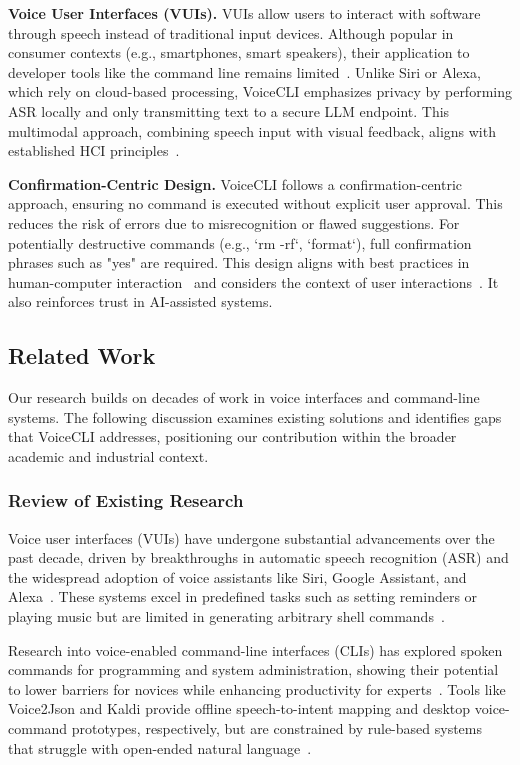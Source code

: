 \documentclass[a4paper,12pt]{article}
\begin{document}
\textbf{Voice User Interfaces (VUIs).} VUIs allow users to interact with software through speech instead of traditional input devices. Although popular in consumer contexts (e.g., smartphones, smart speakers), their application to developer tools like the command line remains limited~\cite{ref7}. Unlike Siri or Alexa, which rely on cloud-based processing, VoiceCLI emphasizes privacy by performing ASR locally and only transmitting text to a secure LLM endpoint. This multimodal approach, combining speech input with visual feedback, aligns with established HCI principles~\cite{ref6}.

\textbf{Confirmation-Centric Design.} VoiceCLI follows a confirmation-centric approach, ensuring no command is executed without explicit user approval. This reduces the risk of errors due to misrecognition or flawed suggestions. For potentially destructive commands (e.g., `rm -rf`, `format`), full confirmation phrases such as "yes" are required. This design aligns with best practices in human-computer interaction~\cite{ref12} and considers the context of user interactions~\cite{ref13}. It also reinforces trust in AI-assisted systems.


\subsection{Related Work}

\noindent Our research builds on decades of work in voice interfaces and command-line systems. The following discussion examines existing solutions and identifies gaps that VoiceCLI addresses, positioning our contribution within the broader academic and industrial context.

\subsubsection{Review of Existing Research}
Voice user interfaces (VUIs) have undergone substantial advancements over the past decade, driven by breakthroughs in automatic speech recognition (ASR) and the widespread adoption of voice assistants like Siri, Google Assistant, and Alexa~\cite{ref7}. These systems excel in predefined tasks such as setting reminders or playing music but are limited in generating arbitrary shell commands~\cite{ref4}. 

Research into voice-enabled command-line interfaces (CLIs) has explored spoken commands for programming and system administration, showing their potential to lower barriers for novices while enhancing productivity for experts~\cite{ref5,ref9}. Tools like Voice2Json and Kaldi provide offline speech-to-intent mapping and desktop voice-command prototypes, respectively, but are constrained by rule-based systems that struggle with open-ended natural language~\cite{ref5}.
\end{document}

